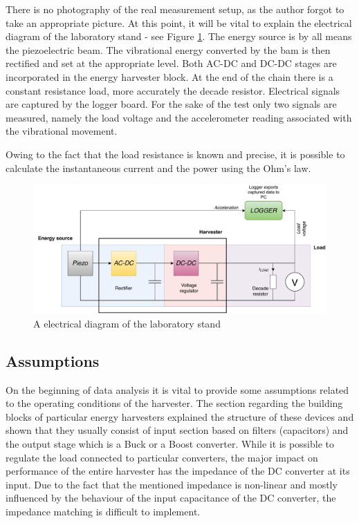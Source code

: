 \documentclass[12pt,a4paper]{article}
\begin{document}
There is no photography of the real measurement setup, as the author forgot to take an appropriate picture. At this point, it will be vital to explain the electrical diagram of the laboratory stand - see Figure \ref{fig:electrical}. The energy source is by all means the piezoelectric beam. The vibrational energy converted by the bam is then rectified and set at the appropriate level. Both AC-DC and DC-DC stages are incorporated in the energy harvester block. At the end of the chain there is a constant resistance load, more accurately the decade resistor. Electrical signals are captured by the logger board. For the sake of the test only two signals are measured, namely the load voltage and the accelerometer reading associated with the vibrational movement.
\par
Owing to the fact that the load resistance is known and precise, it is possible to calculate the instantaneous current and the power using the Ohm's law. 
\begin{figure}[ht!]
\includegraphics[scale=0.6]{electricaldiagram.pdf}
\caption{A electrical diagram of the laboratory stand}
\label{fig:electrical}
\end{figure}

\par

\subsection{Assumptions}

On the beginning of data analysis it is vital to provide some assumptions related to the operating conditions of the harvester. The section regarding the building blocks of particular energy harvesters explained the structure of these devices and shown that they usually consist of input section based on filters (capacitors) and the output stage which is a Buck or a Boost converter. While it is possible to regulate the load connected to particular converters, the major impact on performance of the entire harvester has the impedance of the DC converter at its input. Due to the fact that the mentioned impedance is non-linear and mostly influenced by the behaviour of the input capacitance of the DC converter, the impedance matching is difficult to implement.\par
\end{document}

